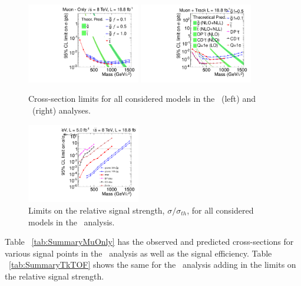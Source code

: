 \begin{figure}
\centering
  \includegraphics[clip=true, trim=0.0cm 0cm 2.8cm 0cm, width=0.44\textwidth]{figures/muonly/MOExclusionLog}
  \includegraphics[clip=true, trim=0.0cm 0cm 2.8cm 0cm, width=0.44\textwidth]{figures/tkmu/MuExclusionLog}
\caption{Cross-section limits for all considered models in the \muononly\ (left) and \tktof\ (right) analyses.
    \label{fig:Exclusion}}
\end{figure}

\begin{figure}
\centering
  \includegraphics[clip=true, trim=0.0cm 0cm 2.8cm 0cm, width=0.44\textwidth]{figures/tkmu/MuExclusionRelLog}
\caption{Limits on the relative signal strength, $\sigma/\sigma_{th}$,  for all considered models in the \tktof\ analysis.
    \label{fig:RelExclusion}}
\end{figure}

Table ~\ref{tab:SummaryMuOnly} has the observed and predicted cross-sections for various signal points in the \muononly\ analysis as well as the signal efficiency. 
Table ~\ref{tab:SummaryTkTOF} shows the same for the \tktof\ analysis adding in the limits on the relative signal strength.

